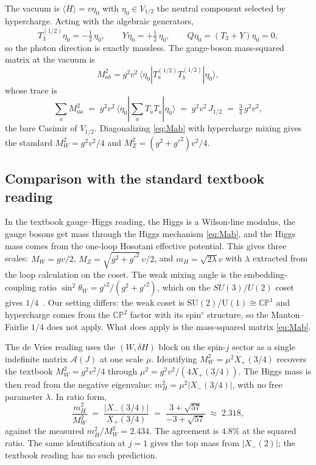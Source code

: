 \documentclass[aps,prd,onecolumn,superscriptaddress,nofootinbib,reprint]{revtex4-2}
\newcommand{\Xp}{X_{+}}
\newcommand{\Xm}{X_{-}}
\newcommand{\half}{\tfrac12}
\newcommand{\cA}{\mathcal{A}}
\newcommand{\SU}{\mathrm{SU}}
\newcommand{\U}{\mathrm{U}}
\newcommand{\CP}{\mathbb{CP}}
\begin{document}
The vacuum is $\langle H\rangle=v\eta_{0}$ with $\eta_{0}\in V_{1/2}$
the neutral component selected by hypercharge.  Acting with the
algebraic generators,
\begin{equation}
  T_{3}^{(1/2)}\eta_{0}=-\half\,\eta_{0},\qquad
  Y\eta_{0}=+\half\,\eta_{0},\qquad
  Q\eta_{0}=(T_{3}+Y)\eta_{0}=0,
\label{eq:Qeta}
\end{equation}
so the photon direction is exactly massless.  The gauge-boson
mass-squared matrix at the vacuum is
\begin{equation}
  M_{ab}^{2}=g^{2}v^{2}\,\langle\eta_{0}|T_{a}^{(1/2)}T_{b}^{(1/2)}|\eta_{0}\rangle,
\label{eq:Mab}
\end{equation}
whose trace is
\begin{equation}
  \sum_{a}M_{aa}^{2}\;=\;g^{2}v^{2}\,\langle\eta_{0}|\sum_{a}T_{a}T_{a}|\eta_{0}\rangle
  \;=\;g^{2}v^{2}\,J_{1/2}\;=\;\tfrac34\,g^{2}v^{2},
\label{eq:Mab-trace}
\end{equation}
the bare Casimir of $V_{1/2}$.  Diagonalizing \eqref{eq:Mab} with
hypercharge mixing gives the standard $M_{W}^{2}=g^{2}v^{2}/4$ and
$M_{Z}^{2}=(g^{2}+g'^{2})v^{2}/4$.

\subsection{Comparison with the standard textbook reading}
\label{app:standard}

In the textbook gauge--Higgs reading, the Higgs is a Wilson-line
modulus, the gauge bosons get mass through the Higgs mechanism
\eqref{eq:Mab}, and the Higgs mass comes from the one-loop Hosotani
effective potential.  This gives three scales: $M_{W}=gv/2$,
$M_{Z}=\sqrt{g^{2}+g'^{2}}\,v/2$, and $m_{H}=\sqrt{2\lambda}v$ with
$\lambda$ extracted from the loop calculation on the coset.  The
weak mixing angle is the embedding-coupling ratio
$\sin^{2}\theta_{W}=g'^{2}/(g^{2}+g'^{2})$, which on the $SU(3)/U(2)$
coset gives $1/4$~\cite{Manton1979,Fairlie1979}.  Our setting differs:
the weak coset is $\SU(2)/\U(1)\cong\CP^{1}$ and hypercharge comes
from the $\CP^{2}$ factor with its spin\(^{c}\) structure, so the
Manton--Fairlie $1/4$ does not apply.  What does apply is the
mass-squared matrix \eqref{eq:Mab}.

The de Vries reading uses the $(W,\delta H)$ block on the spin-$j$
sector as a single indefinite matrix $\cA(J)$ at one scale $\mu$.
Identifying $M_{W}^{2}=\mu^{2}\Xp(3/4)$ recovers the textbook
$M_{W}^{2}=g^{2}v^{2}/4$ through $\mu^{2}=g^{2}v^{2}/(4\Xp(3/4))$.
The Higgs mass is then read from the negative eigenvalue:
$m_{H}^{2}=\mu^{2}|\Xm(3/4)|$, with no free parameter $\lambda$.  In
ratio form,
\begin{equation}
  \frac{m_{H}^{2}}{M_{W}^{2}}\;=\;\frac{|\Xm(3/4)|}{\Xp(3/4)}\;=\;\frac{3+\sqrt{57}}{-3+\sqrt{57}}\;\approx\;2.318,
\end{equation}
against the measured $m_{H}^{2}/M_{W}^{2}=2.434$.  The agreement is
$4.8\%$ at the squared ratio.  The same identification at $j=1$ gives
the top mass from $|\Xm(2)|$; the textbook reading has no such
prediction.
\end{document}
